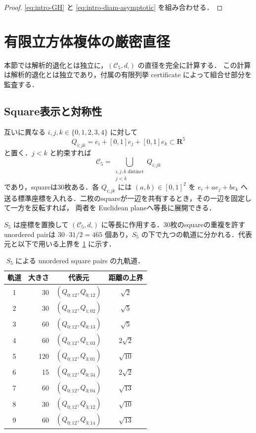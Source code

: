 \documentclass[a4paper,11pt]{ltjsarticle}
\numberwithin{equation}{section}
\theoremstyle{plain}
\theoremstyle{definition}
\theoremstyle{remark}
\newcommand{\RR}{\mathbf R}
\newcommand{\cC}{\mathcal C}
\begin{document}
\begin{proof}
\cref{eq:intro-GH} と \cref{eq:intro-diam-asymptotic} を組み合わせる．
\end{proof}

\section{有限立方体複体の厳密直径}\label{sec:finite-diameter}

本節では解析的退化とは独立に，$(\cC_5,d_\square)$ の直径を完全に計算する．
この計算は解析的退化とは独立であり，付属の有限列挙 certificate によって組合せ部分を監査する．

\subsection{Square表示と対称性}

互いに異なる $i,j,k\in\{0,1,2,3,4\}$ に対して
\begin{equation}\label{eq:square-Qijk}
 Q_{i;jk}=e_i+[0,1]e_j+[0,1]e_k\subset\RR^5
\end{equation}
と置く．$j<k$ と約束すれば
\begin{equation}\label{eq:C5-square-union}
 \cC_5=\bigcup_{\substack{i,j,k\text{ distinct}\\j<k}}Q_{i;jk}
\end{equation}
であり，squareは30枚ある．各 $Q_{i;jk}$ には $(a,b)\in[0,1]^2$ を
$e_i+ae_j+be_k$ へ送る標準座標を入れる．二枚のsquareが一辺を共有するとき，その一辺を固定して一方を反転すれば，
両者を Euclidean planeへ等長に展開できる．

$S_5$ は座標を置換して $(\cC_5,d_\square)$ に等長に作用する．30枚のsquareの重複を許す unordered pairは
$30\cdot31/2=465$ 個あり，$S_5$ の下で九つの軌道に分かれる．代表元と以下で用いる上界を
\cref{tab:nine-square-orbits} に示す．

\begin{table}[htbp]
\centering
\small
\caption{$S_5$ による unordered square pairs の九軌道．}
\label{tab:nine-square-orbits}
\begin{tabular}{@{}c r c c@{}}
\toprule
軌道 & 大きさ & 代表元 & 距離の上界\\
\midrule
1 & 30  & $(Q_{0;12},Q_{0;12})$ & $\sqrt2$\\
2 & 30  & $(Q_{0;12},Q_{1;02})$ & $\sqrt5$\\
3 & 60  & $(Q_{0;12},Q_{0;13})$ & $\sqrt5$\\
4 & 60  & $(Q_{0;12},Q_{1;03})$ & $2\sqrt2$\\
5 & 120 & $(Q_{0;12},Q_{3;01})$ & $\sqrt{10}$\\
6 & 15  & $(Q_{0;12},Q_{0;34})$ & $2\sqrt2$\\
7 & 60  & $(Q_{0;12},Q_{3;04})$ & $\sqrt{13}$\\
8 & 30  & $(Q_{0;12},Q_{3;12})$ & $\sqrt{10}$\\
9 & 60  & $(Q_{0;12},Q_{3;14})$ & $\sqrt{13}$\\
\bottomrule
\end{tabular}
\end{table}
\end{document}
